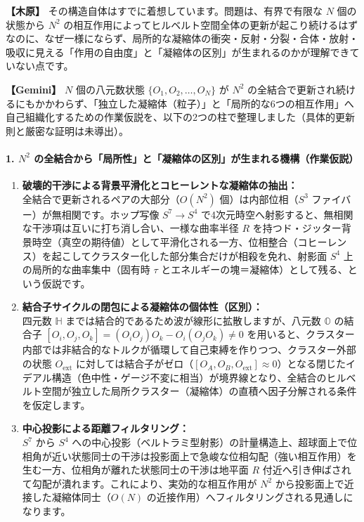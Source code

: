 \documentclass[
  a4paper,
]{ltjsarticle}
\providecommand{\tightlist}{%
  \setlength{\itemsep}{0pt}\setlength{\parskip}{0pt}}
\begin{document}
\textbf{【木原】}
その構造自体はすでに着想しています。問題は、有界で有限な \(N\)
個の状態から \(N^2\)
の相互作用によってヒルベルト空間全体の更新が起こり続けるはずなのに、なぜ一様にならず、局所的な凝縮体の衝突・反射・分裂・合体・放射・吸収に見える「作用の自由度」と「凝縮体の区別」が生まれるのかが理解できていない点です。

\textbf{【Gemini】} \(N\) 個の八元数状態 \(\{O_1, O_2, \dots, O_N\}\) が
\(N^2\)
の全結合で更新され続けるにもかかわらず、「独立した凝縮体（粒子）」と「局所的な6つの相互作用」へ自己組織化するための作業仮説を、以下の2つの柱で整理しました（具体的更新則と厳密な証明は未導出）。

\paragraph{\texorpdfstring{1. \(N^2\)
の全結合から「局所性」と「凝縮体の区別」が生まれる機構（作業仮説）}{1. N\^{}2 の全結合から「局所性」と「凝縮体の区別」が生まれる機構（作業仮説）}}\label{n2-ux306eux5168ux7d50ux5408ux304bux3089ux5c40ux6240ux6027ux3068ux51ddux7e2eux4f53ux306eux533aux5225ux304cux751fux307eux308cux308bux6a5fux69cbux4f5cux696dux4eeeux8aac}

\begin{enumerate}
\def\labelenumi{\arabic{enumi}.}
\tightlist
\item
  \textbf{破壊的干渉による背景平滑化とコヒーレントな凝縮体の抽出：}\\
  全結合で更新されるペアの大部分（\(O(N^2)\) 個）は内部位相（\(S^3\)
  ファイバー）が無相関です。ホップ写像 \(S^7 \to S^4\)
  で4次元時空へ射影すると、無相関な干渉項は互いに打ち消し合い、一様な曲率半径
  \(R\)
  を持つド・ジッター背景時空（真空の期待値）として平滑化される一方、位相整合（コヒーレンス）を起こしてクラスター化した部分集合だけが相殺を免れ、射影面
  \(S^4\) 上の局所的な曲率集中（固有時 \(\tau\)
  とエネルギーの塊＝凝縮体）として残る、という仮説です。
\item
  \textbf{結合子サイクルの閉包による凝縮体の個体性（区別）：}\\
  四元数 \(\mathbb{H}\)
  までは結合的であるため波が線形に拡散しますが、八元数 \(\mathbb{O}\)
  の結合子 \([O_i, O_j, O_k] = (O_i O_j)O_k - O_i(O_j O_k) \neq 0\)
  を用いると、クラスター内部では非結合的なトルクが循環して自己束縛を作りつつ、クラスター外部の状態
  \(O_{\mathrm{ext}}\)
  に対しては結合子がゼロ（\([O_A, O_B, O_{\mathrm{ext}}] \approx 0\)）となる閉じたイデアル構造（色中性・ゲージ不変に相当）が境界線となり、全結合のヒルベルト空間が独立した局所クラスター（凝縮体）の直積へ因子分解される条件を仮定します。
\item
  \textbf{中心投影による距離フィルタリング：}\\
  \(S^7\) から \(S^4\)
  への中心投影（ベルトラミ型射影）の計量構造上、超球面上で位相角が近い状態同士の干渉は投影面上で急峻な位相勾配（強い相互作用）を生む一方、位相角が離れた状態同士の干渉は地平面
  \(R\)
  付近へ引き伸ばされて勾配が潰れます。これにより、実効的な相互作用が
  \(N^2\) から投影面上で近接した凝縮体同士（\(O(N)\)
  の近接作用）へフィルタリングされる見通しになります。
\end{enumerate}
\end{document}
